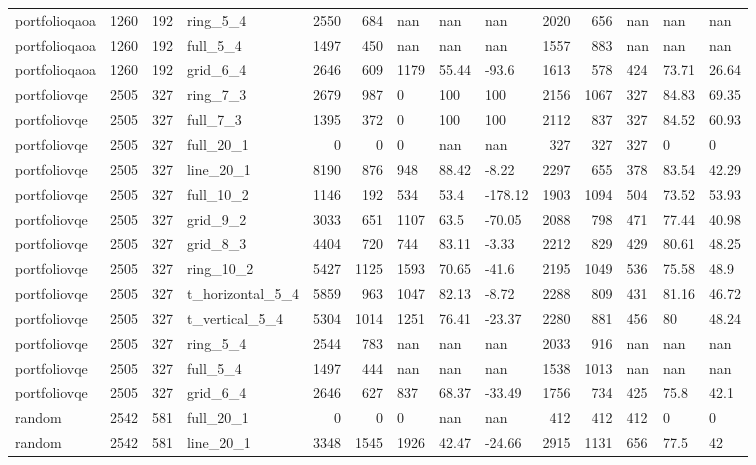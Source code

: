 \begin{longtable}{lrrlrrlllrrlll}
portfolioqaoa & 1260 & 192 & ring\_5\_4 & 2550 & 684 & nan & nan & nan & 2020 & 656 & nan & nan & nan \\
portfolioqaoa & 1260 & 192 & full\_5\_4 & 1497 & 450 & nan & nan & nan & 1557 & 883 & nan & nan & nan \\
portfolioqaoa & 1260 & 192 & grid\_6\_4 & 2646 & 609 & 1179 & 55.44 & -93.6 & 1613 & 578 & 424 & 73.71 & 26.64 \\
portfoliovqe & 2505 & 327 & ring\_7\_3 & 2679 & 987 & 0 & 100 & 100 & 2156 & 1067 & 327 & 84.83 & 69.35 \\
portfoliovqe & 2505 & 327 & full\_7\_3 & 1395 & 372 & 0 & 100 & 100 & 2112 & 837 & 327 & 84.52 & 60.93 \\
portfoliovqe & 2505 & 327 & full\_20\_1 & 0 & 0 & 0 & nan & nan & 327 & 327 & 327 & 0 & 0 \\
portfoliovqe & 2505 & 327 & line\_20\_1 & 8190 & 876 & 948 & 88.42 & -8.22 & 2297 & 655 & 378 & 83.54 & 42.29 \\
portfoliovqe & 2505 & 327 & full\_10\_2 & 1146 & 192 & 534 & 53.4 & -178.12 & 1903 & 1094 & 504 & 73.52 & 53.93 \\
portfoliovqe & 2505 & 327 & grid\_9\_2 & 3033 & 651 & 1107 & 63.5 & -70.05 & 2088 & 798 & 471 & 77.44 & 40.98 \\
portfoliovqe & 2505 & 327 & grid\_8\_3 & 4404 & 720 & 744 & 83.11 & -3.33 & 2212 & 829 & 429 & 80.61 & 48.25 \\
portfoliovqe & 2505 & 327 & ring\_10\_2 & 5427 & 1125 & 1593 & 70.65 & -41.6 & 2195 & 1049 & 536 & 75.58 & 48.9 \\
portfoliovqe & 2505 & 327 & t\_horizontal\_5\_4 & 5859 & 963 & 1047 & 82.13 & -8.72 & 2288 & 809 & 431 & 81.16 & 46.72 \\
portfoliovqe & 2505 & 327 & t\_vertical\_5\_4 & 5304 & 1014 & 1251 & 76.41 & -23.37 & 2280 & 881 & 456 & 80 & 48.24 \\
portfoliovqe & 2505 & 327 & ring\_5\_4 & 2544 & 783 & nan & nan & nan & 2033 & 916 & nan & nan & nan \\
portfoliovqe & 2505 & 327 & full\_5\_4 & 1497 & 444 & nan & nan & nan & 1538 & 1013 & nan & nan & nan \\
portfoliovqe & 2505 & 327 & grid\_6\_4 & 2646 & 627 & 837 & 68.37 & -33.49 & 1756 & 734 & 425 & 75.8 & 42.1 \\
random & 2542 & 581 & full\_20\_1 & 0 & 0 & 0 & nan & nan & 412 & 412 & 412 & 0 & 0 \\
random & 2542 & 581 & line\_20\_1 & 3348 & 1545 & 1926 & 42.47 & -24.66 & 2915 & 1131 & 656 & 77.5 & 42 \\

\end{longtable}
